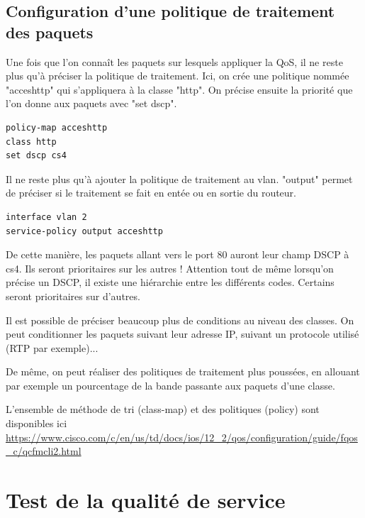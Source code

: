         \subsection{Configuration d'une politique de traitement des paquets}

		Une fois que l'on connaît les paquets sur lesquels appliquer la QoS, il ne reste plus qu'à préciser la politique de traitement. 
        Ici, on crée une politique nommée "acceshttp" qui s'appliquera à la classe "http". On précise ensuite la priorité que l'on donne aux paquets avec "set dscp". 
		\begin{lstlisting}[frame=single]
policy-map acceshttp 
class http
set dscp cs4
        \end{lstlisting}
       
        Il ne reste plus qu'à ajouter la politique de traitement au vlan. "output" permet de préciser si le traitement se fait en entée ou en sortie du routeur. 
        \begin{lstlisting}[frame=single]
interface vlan 2 
service-policy output acceshttp
        \end{lstlisting}

		De cette manière, les paquets allant vers le port 80 auront leur champ DSCP à cs4. Ils seront prioritaires sur les autres ! Attention tout de même lorsqu'on précise un DSCP, il existe une hiérarchie entre les différents codes. Certains seront prioritaires sur d'autres.
        
        Il est possible de préciser beaucoup plus de conditions au niveau des classes. On peut conditionner les paquets suivant leur adresse IP, suivant un protocole utilisé (RTP par exemple)...
        
        De même, on peut réaliser des politiques de traitement plus poussées, en allouant par exemple un pourcentage de la bande passante aux paquets d'une classe.
        
        L'ensemble de méthode de tri (class-map) et des politiques (policy) sont disponibles ici \url{https://www.cisco.com/c/en/us/td/docs/ios/12_2/qos/configuration/guide/fqos_c/qcfmcli2.html}

    \section{Test de la qualité de service}
    
